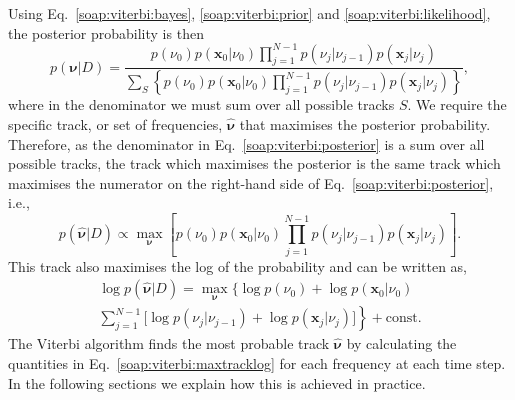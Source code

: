 Using Eq.~\ref{soap:viterbi:bayes}, \ref{soap:viterbi:prior} and
\ref{soap:viterbi:likelihood}, the posterior probability is then
%
\begin{equation}
\label{soap:viterbi:posterior}
    p({\bm \nu} | D) =
    \frac{p(\nu_0)p({\bm x_0} | \nu_0) \displaystyle\prod_{j=1}^{N-1}p(\nu_{j}
| \nu_{j-1})p({\bm x_j} | \nu_j)}{\displaystyle\sum_{S}
\left\{p(\nu_0)p({\bm x_0} | \nu_0)\displaystyle\prod_{j=1}^{N-1}p(\nu_{j} |
\nu_{j-1})p({\bm x_j} | \nu_j)\right\}} ,
\end{equation}
%
where in the denominator we must sum over all possible tracks
$S$. We require the specific track, or set of frequencies, $\hat{\bm
\nu}$ that  maximises the posterior probability. Therefore, as the denominator in Eq.~\ref{soap:viterbi:posterior} is a sum over all possible tracks, the track which maximises the posterior is the same track which
maximises the numerator  on the right-hand side of  Eq.~\ref{soap:viterbi:posterior}, i.e.,
%
\begin{equation}
\label{soap:viterbi:maxtrack}
  p(\hat{\bm \nu} | D) \propto \max_{\bm \nu}{\left[p(\nu_0)p({\bm x_0} |
\nu_0) \prod_{j=1}^{N-1}p(\nu_{j} |\nu_{j-1})p({\bm x_j} | \nu_j)\right]}.
\end{equation}
%
This track also maximises the log of the probability and can be written as,
%
\begin{equation}
\label{soap:viterbi:maxtracklog}
\begin{split}
  \log p(\hat{\bm \nu} | D)  = \max_{{\bm \nu}}{\biggl\{ \log p(\nu_0) + \log p({\bm x_0} | \nu_0)  } \\
 \left. \sum_{j=1}^{N-1} \biggl[ \log p(\nu_{j} | \nu_{j-1}) + \log p({\bm x_j}
| \nu_j) \biggr] \right\} + \text{const}.
  \end{split}
\end{equation}
%
The Viterbi algorithm finds the most probable track $\hat{\bm \nu}$ by calculating the quantities in Eq.~\ref{soap:viterbi:maxtracklog} for each frequency at each time step. In the following sections we explain how this is achieved in practice.

